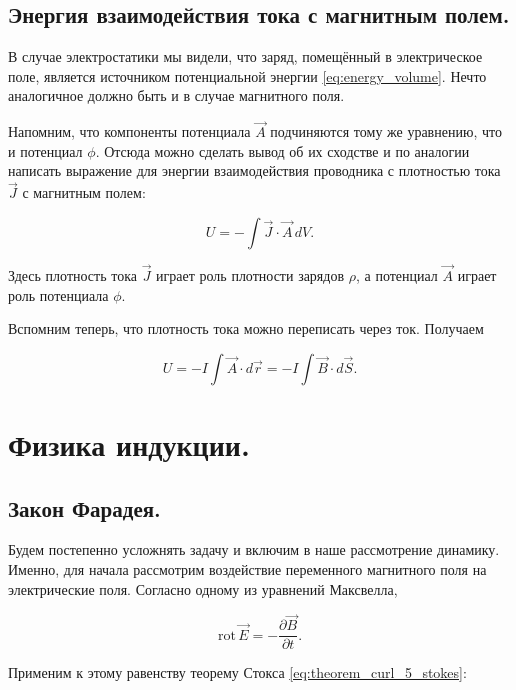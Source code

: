\documentclass[11pt,a4paper]{article}
\numberwithin{equation}{section}
\newcommand{\pt}{\partial}
\newcommand{\rot}{\mathrm{rot}\,}
\begin{document}
\subsection{Энергия взаимодействия тока с магнитным полем. }
\label{sec:magnet_energy}

В случае электростатики мы видели, что заряд, помещённый в
электрическое поле, является источником потенциальной энергии
\eqref{eq:energy_volume}. Нечто аналогичное должно быть и в случае
магнитного поля. 

Напомним, что компоненты потенциала $\vec{A}$ подчиняются тому же
уравнению, что и потенциал $\phi$. Отсюда можно сделать вывод об их
сходстве и по аналогии написать выражение для энергии взаимодействия
проводника с плотностью тока $\vec{J}$ с магнитным полем: 

\begin{equation}
  \label{eq:magnet_energy_1}
  U = - \int \vec{J} \cdot \vec{A} \, dV.
\end{equation}

Здесь плотность тока $\vec{J}$ играет роль плотности зарядов $\rho$, а
потенциал $\vec{A}$ играет роль потенциала $\phi$. 

Вспомним теперь, что плотность тока можно переписать через
ток. Получаем

\begin{equation}
  \label{eq:magnet_energy_2}
  U = - I \int \vec{A} \cdot d \vec{r} = - I \int \vec{B} \cdot d \vec{S}.
\end{equation}

\section{Физика индукции.}
\label{sec:induction}

\subsection{Закон Фарадея.}
\label{sec:faradays_law}

Будем постепенно усложнять задачу и включим в наше рассмотрение
динамику. Именно, для начала рассмотрим воздействие переменного
магнитного поля на электрические поля. Согласно одному из уравнений
Максвелла, 

\begin{equation}
  \label{eq:der_faraday_1}
  \rot \vec{E} = -\frac{\pt \vec{B}}{\pt t}.
\end{equation}

Применим к этому равенству теорему Стокса
\eqref{eq:theorem_curl_5_stokes}:
\end{document}

